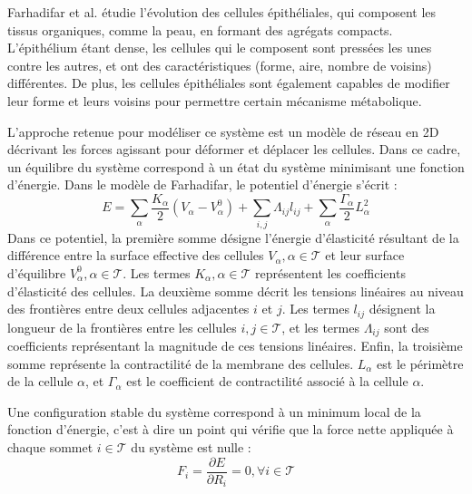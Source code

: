 \documentclass[11pt,a4paper]{article}
\begin{document}
Farhadifar et al. \cite{farhadifar2007influence} étudie l'évolution des cellules épithéliales, qui composent les tissus organiques, comme la peau, en formant des agrégats compacts. L'épithélium étant dense, les cellules qui le composent sont pressées les unes contre les autres, et ont des caractéristiques (forme, aire, nombre de voisins) différentes. De plus, les cellules épithéliales sont également capables de modifier leur forme et leurs voisins pour permettre certain mécanisme métabolique.  

L'approche retenue pour modéliser ce système est un modèle de réseau en 2D décrivant les forces agissant pour déformer et déplacer les cellules. Dans ce cadre, un équilibre du système correspond à un état du système minimisant une fonction d'énergie. Dans le modèle de Farhadifar, le potentiel d'énergie s'écrit : $$E = \sum_\alpha \frac{K_\alpha}{2}(V_\alpha - V_\alpha^0)+\sum_{i,j}\Lambda_{ij}l_{ij} + \sum_\alpha\frac{\Gamma_\alpha}{2}L_\alpha^2 $$
Dans ce potentiel, la première somme désigne l'énergie d'élasticité résultant de la différence entre la surface effective des cellules $V_\alpha , \alpha \in \mathcal{T}$ et leur surface d'équilibre $V^0_\alpha , \alpha \in \mathcal{T}$. Les termes $K_\alpha, \alpha \in \mathcal{T}$ représentent les coefficients d'élasticité des cellules. La deuxième somme décrit les tensions linéaires au niveau des frontières entre deux cellules adjacentes $i$ et $j$. Les termes $l_{ij}$ désignent la longueur de la frontières entre les cellules $i,j \in \mathcal{T}$, et les termes $\Lambda_{ij}$ sont des coefficients représentant la magnitude de ces tensions linéaires. Enfin, la troisième somme représente la contractilité de la membrane des cellules. $L_\alpha$ est le périmètre de la cellule $\alpha$, et $\Gamma_\alpha$ est le coefficient de contractilité associé à la cellule $\alpha$.

Une configuration stable du système correspond à un minimum local de la fonction d'énergie, c'est à dire un point qui vérifie que la force nette appliquée à chaque sommet $i \in \mathcal{T}$ du système est nulle : $$F_i = \frac{\partial E}{\partial R_i} = 0, \forall i \in \mathcal{T}$$ 
\end{document}
